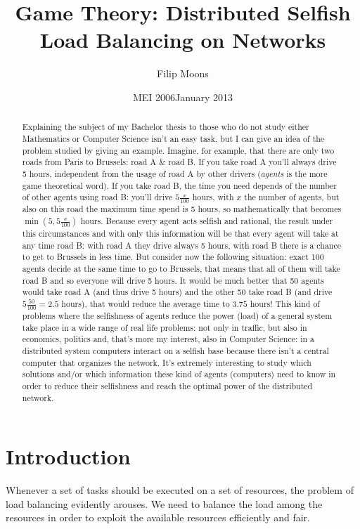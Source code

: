 \documentclass[a4paper,11pt]{article}
\author{Filip Moons}
\title{Game Theory: Distributed Selfish Load Balancing on Networks}
\date{MEI 2006}
\date{January 2013}
\begin{document}
\maketitlepage
\newpage
\null\vspace{\fill}
\begin{abstract}
Explaining the subject of my Bachelor thesis to those who do not study either Mathematics or Computer Science isn't an easy task, but I can give an idea of the problem studied by giving an example. Imagine, for example, that there are only two roads from Paris to Brussels: road A \& road B. If you take road A you'll always drive 5 hours, independent from the usage of road A by other drivers (\emph{agents} is the more game theoretical word). If you take road B, the time you need depends of the number of other agents using road B: you'll drive $5\frac{x}{100}$ hours, with $x$ the number of agents, but also on this road the maximum time spend is 5 hours, so mathematically that becomes $\min(5, 5\frac{x}{100})$ hours. Because every agent acts selfish and rational, the result under this circumstances and with only this information will be that every agent will take at any time road B: with road A they drive always 5 hours, with road B there is a chance to get to Brussels in less time. But consider now the following situation: exact 100 agents decide at the same time to go to Brussels, that means that all of them will take road B and so everyone will drive 5 hours. It would be much better that 50 agents would take road A (and thus drive 5 hours) and the other 50 take road B (and drive $5\frac{50}{100} = 2.5$ hours), that would reduce the average time to $3.75$ hours! This kind of problems where the selfishness of agents reduce the power (load) of a general system take place in a wide range of real life problems: not only in traffic, but also in economics, politics and, that's more my interest, also in Computer Science: in a distributed system computers interact on a selfish base because there isn't a central computer that organizes the network. It's extremely interesting to study which solutions and/or which information these kind of agents (computers) need to know in order to reduce their selfishness and reach the optimal power of the distributed network.
\end{abstract}
\vspace{\fill}
\newpage

\tableofcontents
\newpage
{}

\section{Introduction}
Whenever a set of tasks should be executed on a set of resources, the problem of load balancing evidently arouses. We need to balance the load among the resources in order to exploit the available resources efficiently and fair.
\end{document}
